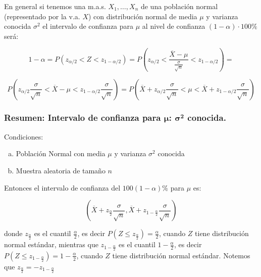 \documentclass[12pt]{report}
\begin{document}
En general si tenemos una m.a.s. $X_{1},\ldots,X_{n}$ de una poblaci\'on normal (representado
por la v.a. $X$) con distribuci\'on normal de media $\mu$ y varianza conocida $\sigma^2$ el
intervalo de confianza para $\mu$ al nivel de confianza $(1-\alpha)\cdot 100\%$ ser\'a:


$$1-\alpha=P(z_{\alpha/2}<Z<z_{1-\alpha/2})=
P(z_{\alpha/2}<\frac{\overline{X}-\mu}{\frac{\sigma}{\sqrt{n}}}<z_{1-\alpha/2}) =$$

$$P(z_{\alpha/2}\frac{\sigma}{\sqrt{n}}<
\overline{X}-\mu<z_{1-\alpha/2}\frac{\sigma}{\sqrt{n}})=
P(\overline{X}+z_{\alpha/2}\frac{\sigma}{\sqrt{n}}<\mu<\overline{X}+z_{1-\alpha/2}\frac{\sigma}
{\sqrt{n}})$$



    \subsubsection{Resumen: Intervalo de confianza para $\mathbf{\mu}$:
    $\mathbf{\sigma^2}$ conocida.}

Condiciones:

    \begin{enumerate}[a)]
    \item Poblaci\'on Normal con media $\mu$ y varianza $\sigma^2$ conocida
    \item Muestra aleatoria de tama\~{n}o $n$
    \end{enumerate}

    Entonces el intervalo de confianza del $100(1-\alpha)\%$ para $\mu$
    es:

    $$\left( \overline{X}+z_{\frac{\alpha}{2}}\frac{\sigma}{\sqrt{n}},
    \overline{X}+z_{1-\frac{\alpha}{2}}\frac{\sigma}{\sqrt{n}}\right)$$

    donde $z_{\frac{\alpha}{2}}$ es el cuantil $\frac{\alpha}{2}$, es decir
    $P(Z\leq z_{\frac{\alpha}{2}})=\frac{\alpha}{2}$, cuando $Z$ tiene
    distribuci\'on normal est\'andar, mientras que  $z_{1-\frac{\alpha}{2}}$
    es el cuantil $1-\frac{\alpha}{2}$, es decir
    $P(Z\leq z_{1-\frac{\alpha}{2}})=1-\frac{\alpha}{2}$, cuando $Z$ tiene
    distribuci\'on normal est\'andar. Notemos que
    $z_{\frac{\alpha}{2}}=-z_{1-\frac{\alpha}{2}}$
\end{document}
